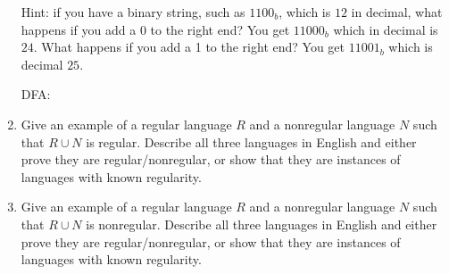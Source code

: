 \documentclass{article}
\begin{document}
\begin{enumerate}
  Hint: if you have a binary string, such as $1100_b$, which is
  $12$ in decimal, what happens if you add a 0 to the right end?
  You get $11000_b$ which in decimal is $24$.  What happens if
  you add a 1 to the right end?  You get $11001_b$ which is decimal
  $25$. 

  DFA:
    


\item Give an example of a regular language $R$ and a nonregular
  language $N$ such that $R\cup N$ is regular.  Describe all three
  languages in English and either prove they are regular/nonregular,
  or show that they are instances of languages with known regularity.



\item Give an example of a regular language $R$ and a nonregular
  language $N$ such that $R\cup N$ is nonregular. Describe all three
  languages in English and either prove they are regular/nonregular,
  or show that they are instances of languages with known regularity.



\end{enumerate}
\end{document}
